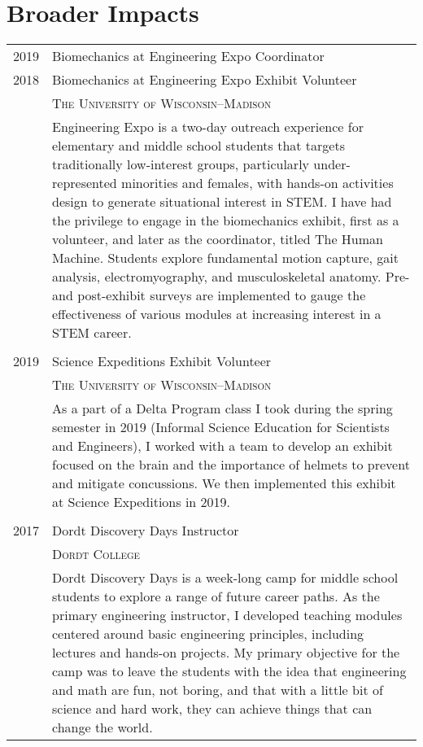 \documentclass[a4paper,10pt]{article} %
\begin{document}

\section{Broader Impacts}

\begin{tabular}{r|p{11cm}}
\textsc{2019} & Biomechanics at Engineering Expo Coordinator \emph{} \\
\textsc{2018} & Biomechanics at Engineering Expo Exhibit Volunteer \emph{} \\ 
& \textsc{The University of Wisconsin--Madison} \\
& \footnotesize{Engineering Expo is a two-day outreach experience for elementary and middle school students that targets traditionally low-interest groups, particularly under-represented minorities and females, with hands-on activities design to generate situational interest in STEM. I have had the privilege to engage in the biomechanics exhibit, first as a volunteer, and later as the coordinator, titled The Human Machine. Students explore fundamental motion capture, gait analysis, electromyography, and musculoskeletal anatomy. Pre- and post-exhibit surveys are implemented to gauge the effectiveness of various modules at increasing interest in a STEM career. } \\
\multicolumn{2}{c}{} \\

\textsc{2019} & Science Expeditions Exhibit Volunteer \emph{} \\ 
& \textsc{The University of Wisconsin--Madison} \\
& \footnotesize{As a part of a Delta Program class I took during the spring semester in 2019 (Informal Science Education for Scientists and Engineers), I worked with a team to develop an exhibit focused on the brain and the importance of helmets to prevent and mitigate concussions. We then implemented this exhibit at Science Expeditions in 2019.} \\
\multicolumn{2}{c}{} \\

\textsc{2017} & Dordt Discovery Days Instructor \emph{} \\ 
& \textsc{Dordt College} \\
& \footnotesize{Dordt Discovery Days is a week-long camp for middle school students to explore a range of future career paths. As the primary engineering instructor, I developed teaching modules centered around basic engineering principles, including lectures and hands-on projects. My primary objective for the camp was to leave the students with the idea that engineering and math are fun, not boring, and that with a little bit of science and hard work, they can achieve things that can change the world. } \\

\end{tabular}
\end{document}

